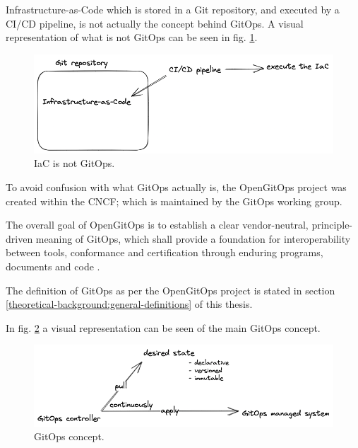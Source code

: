 Infrastructure-as-Code which is stored in a Git repository,
and executed by a CI/CD pipeline,
is not actually the concept behind GitOps.
A visual representation of what is not GitOps can be seen in
fig. \ref{fig:iacIsNotGitOps}.

\begin{figure}[h]
	\centering
	\includegraphics[width=1.00\linewidth]{assets/iac-is-not-gitops.png}
	\caption{IaC is not GitOps.
	}
	\label{fig:iacIsNotGitOps}	
\end{figure}

To avoid confusion with what GitOps actually is, 
the OpenGitOps project
\autocite{openGitOpsProject}
was created within the CNCF;
which is maintained by the GitOps working group.

The overall goal of OpenGitOps is to establish a clear vendor-neutral,
principle-driven meaning of GitOps,
which shall provide a foundation for interoperability between tools, conformance and certification through enduring programs, documents and code
\autocite{opengitopsDocuments}.

The definition of GitOps as per the OpenGitOps project
is stated in section \ref{theoretical-background:general-definitions} of this thesis.

In fig. \ref{fig:gitOpsConcept} a visual representation can be seen of the main GitOps concept.

\begin{figure}[h]
	\centering
	\includegraphics[width=1.00\linewidth]{assets/gitops-concept.png}
	\caption{GitOps concept.
	}
	\label{fig:gitOpsConcept}	
\end{figure}







